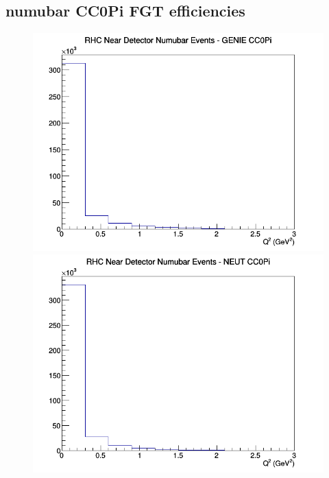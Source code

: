 \documentclass[12pt]{article}
\begin{document}
\subsection{numubar CC0Pi FGT efficiencies}
\begin{figure}[h]
\includegraphics[width=\linewidth]{eff_Q2/FGT/CC0Pi_RHC_ND_numubar_Q2_GENIE.png}
\endminipage
{}
\includegraphics[width=\linewidth]{eff_Q2/FGT/CC0Pi_RHC_ND_numubar_Q2_NEUT.png}
\endminipage
{}

\end{figure}
\end{document}
